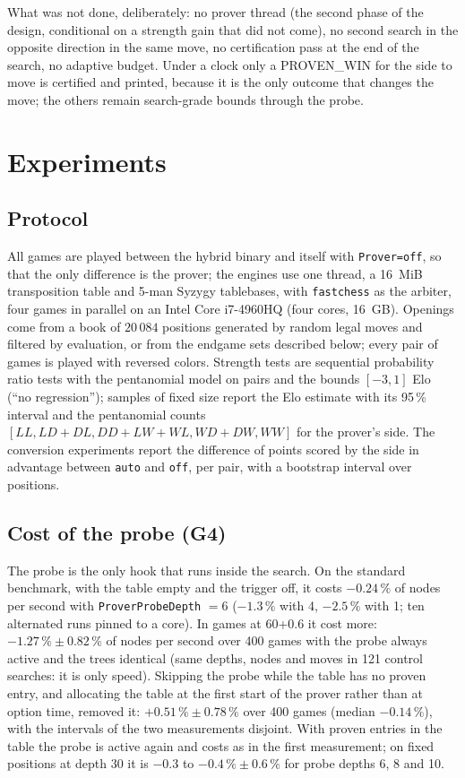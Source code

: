 \documentclass{article}
\theoremstyle{plain}
\theoremstyle{definition}
\theoremstyle{remark}
\newcommand{\PW}{\textsf{PROVEN\_WIN}}
\newcommand{\code}[1]{\texttt{#1}}
\begin{document}
What was not done, deliberately: no prover thread (the second phase of the design, conditional on a strength gain that did not come), no second search in the opposite direction in the same move, no certification pass at the end of the search, no adaptive budget. Under a clock only a \PW{} for the side to move is certified and printed, because it is the only outcome that changes the move; the others remain search-grade bounds through the probe.

\section{Experiments}\label{sec:experiments}

\subsection{Protocol}

All games are played between the hybrid binary and itself with \code{Prover=off}, so that the only difference is the prover; the engines use one thread, a 16~MiB transposition table and 5-man Syzygy tablebases, with \code{fastchess} \cite{fastchess} as the arbiter, four games in parallel on an Intel Core i7-4960HQ (four cores, 16~GB). Openings come from a book of $20\,084$ positions generated by random legal moves and filtered by evaluation, or from the endgame sets described below; every pair of games is played with reversed colors. Strength tests are sequential probability ratio tests \cite{wald1945} with the pentanomial model on pairs and the bounds $[-3, 1]$ Elo (``no regression''); samples of fixed size report the Elo estimate with its 95\,\% interval and the pentanomial counts $[LL, LD{+}DL, DD{+}LW{+}WL, WD{+}DW, WW]$ for the prover's side. The conversion experiments report the difference of points scored by the side in advantage between \code{auto} and \code{off}, per pair, with a bootstrap interval over positions.

\subsection{Cost of the probe (G4)}\label{sec:g4}

The probe is the only hook that runs inside the search. On the standard benchmark, with the table empty and the trigger off, it costs $-0.24\,\%$ of nodes per second with \code{ProverProbeDepth} $= 6$ ($-1.3\,\%$ with 4, $-2.5\,\%$ with 1; ten alternated runs pinned to a core). In games at 60+0.6 it cost more: $-1.27\,\% \pm 0.82\,\%$ of nodes per second over 400 games with the probe always active and the trees identical (same depths, nodes and moves in 121 control searches: it is only speed). Skipping the probe while the table has no proven entry, and allocating the table at the first start of the prover rather than at option time, removed it: $+0.51\,\% \pm 0.78\,\%$ over 400 games (median $-0.14\,\%$), with the intervals of the two measurements disjoint. With proven entries in the table the probe is active again and costs as in the first measurement; on fixed positions at depth 30 it is $-0.3$ to $-0.4\,\% \pm 0.6\,\%$ for probe depths 6, 8 and 10.
\end{document}
